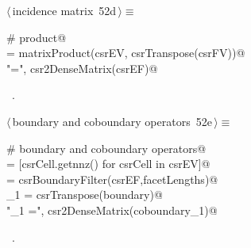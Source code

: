 \documentclass[11pt,oneside]{article}    %
\begin{document}
\begin{flushleft} \small \label{scrap88}
\protect{}$\langle\,$incidence matrix\nobreak\ {\footnotesize 52d}$\,\rangle\equiv$
\vspace{-1ex}
\begin{list}{}{} \item
\mbox{}\verb@# product@\\
\mbox{}\verb@csrEF = matrixProduct(csrEV, csrTranspose(csrFV))@\\
\mbox{}\verb@print "\nEF =\n", csr2DenseMatrix(csrEF)@\\
\mbox{}\verb@@{\NWsep}
\end{list}
\vspace{-1ex}
\footnotesize\addtolength{\baselineskip}{-1ex}
\begin{list}{}{\setlength{\itemsep}{-\parsep}\setlength{\itemindent}{-\leftmargin}}
\item \NWtxtMacroRefIn\ .
\end{list}
\end{flushleft}

\begin{flushleft} \small \label{scrap89}
\protect{}$\langle\,$boundary and coboundary operators\nobreak\ {\footnotesize 52e}$\,\rangle\equiv$
\vspace{-1ex}
\begin{list}{}{} \item
\mbox{}\verb@# boundary and coboundary operators@\\
\mbox{}\verb@facetLengths = [csrCell.getnnz() for csrCell in csrEV]@\\
\mbox{}\verb@boundary = csrBoundaryFilter(csrEF,facetLengths)@\\
\mbox{}\verb@coboundary_1 = csrTranspose(boundary)@\\
\mbox{}\verb@print "\ncoboundary_1 =\n", csr2DenseMatrix(coboundary_1)@\\
\mbox{}\verb@@{\NWsep}
\end{list}
\vspace{-1ex}
\footnotesize\addtolength{\baselineskip}{-1ex}
\begin{list}{}{\setlength{\itemsep}{-\parsep}\setlength{\itemindent}{-\leftmargin}}
\item \NWtxtMacroRefIn\ .
\end{list}
\end{flushleft}
\end{document}
